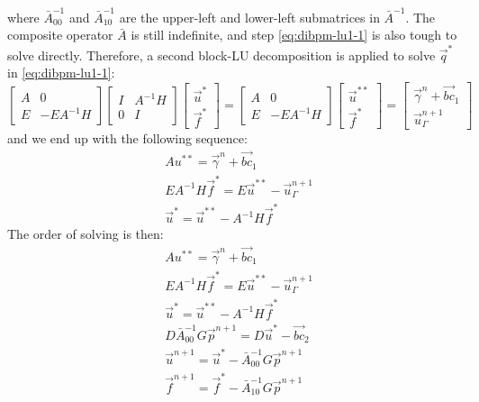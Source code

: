 where $\bar{A}_{00}^{-1}$ and $\bar{A}_{10}^{-1}$ are the upper-left and lower-left submatrices in $\bar{A}^{-1}$.
The composite operator $\bar{A}$ is still indefinite, and step \eqref{eq:dibpm-lu1-1} is also tough to solve directly.
Therefore, a second block-LU decomposition is applied to solve $\vec{q}^{*}$ in \eqref{eq:dibpm-lu1-1}:
\begin{equation}
    \begin{bmatrix}
        A & 0 \\
        E & -EA^{-1}H
    \end{bmatrix}
    \begin{bmatrix}
        I & A^{-1}H \\
        0 & I
    \end{bmatrix}
    \begin{bmatrix}
        \vec{u}^* \\
        \vec{f}^*
    \end{bmatrix}
    =
    \begin{bmatrix}
        A & 0 \\
        E & -EA^{-1}H
    \end{bmatrix}
    \begin{bmatrix}
        \vec{u}^{* *} \\
        \vec{f}^*
    \end{bmatrix}
    =
    \begin{bmatrix}
        \vec{\gamma}^n + \vec{bc}_1 \\
        \vec{u}_\Gamma^{n+1}
    \end{bmatrix}
\end{equation}
and we end up with the following sequence:
\begin{subequations}
    \begin{align}
        & A u^{* *} = \vec{\gamma}^n + \vec{bc}_1\label{eq:dibpm-lu2-1} \\
        & EA^{-1}H \vec{f}^* = E \vec{u}^{* *} - \vec{u}_\Gamma^{n+1}\label{eq:dibpm-lu2-2} \\
        & \vec{u}^* = \vec{u}^{* *} - A^{-1}H \vec{f}^*\label{eq:dibpm-lu2-3}
    \end{align}
\end{subequations}
The order of solving is then:
\begin{subequations}
    \begin{align}
        & A u^{* *} = \vec{\gamma}^n + \vec{bc}_1\label{eq:dibpm-order1-1} \\
        & EA^{-1}H \vec{f}^* = E \vec{u}^{* *} - \vec{u}_\Gamma^{n+1}\label{eq:dibpm-order1-2} \\
        & \vec{u}^* = \vec{u}^{* *} - A^{-1}H \vec{f}^*\label{eq:dibpm-order1-3}\\
        & D\bar{A}_{00}^{-1}G \vec{p}^{n+1} = D \vec{u}^* - \vec{bc}_2\label{eq:dibpm-order1-4} \\
        & \vec{u}^{n+1} = \vec{u}^* - \bar{A}_{00}^{-1}G \vec{p}^{n+1}\label{eq:dibpm-order1-5} \\
        & \vec{f}^{n+1} = \vec{f}^* - \bar{A}_{10}^{-1}G \vec{p}^{n+1}\label{eq:dibpm-order1-6}
    \end{align}
\end{subequations}

